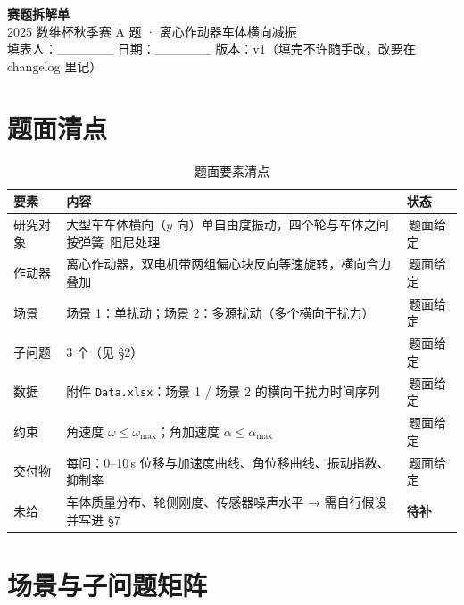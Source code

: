 \documentclass[a4paper,11pt]{ctexart}
\newcommand{\src}[1]{{\footnotesize\colorbox{black!8}{\,#1\,}}}
\newcommand{\given}{\src{题面给定}}
\begin{document}
\begin{center}
  {\LARGE\bfseries 赛题拆解单}\\[0.5em]
  {\large 2025 数维杯秋季赛 A 题 · 离心作动器车体横向减振}\\[0.4em]
  {\small 填表人：\_\_\_\_\_\_ \quad 日期：\_\_\_\_\_\_ \quad 版本：v1（填完不许随手改，改要在 changelog 里记）}
\end{center}

\vspace{0.6em}

\section{题面清点}

\begin{table}[htbp]\centering\small
  \caption{题面要素清点}
  \begin{tabular}{@{}L{0.16\textwidth}L{0.54\textwidth}L{0.16\textwidth}@{}}
    \toprule
    要素 & 内容 & 状态 \\
    \midrule
    研究对象 & 大型车车体横向（$y$ 向）单自由度振动，四个轮与车体之间按弹簧--阻尼处理 & \given \\
    作动器   & 离心作动器，双电机带两组偏心块反向等速旋转，横向合力叠加 & \given \\
    场景     & 场景 1：单扰动；场景 2：多源扰动（多个横向干扰力） & \given \\
    子问题   & 3 个（见 §2） & \given \\
    数据     & 附件 \texttt{Data.xlsx}：场景 1 / 场景 2 的横向干扰力时间序列 & \given \\
    约束     & 角速度 $\omega\le\omega_{\max}$；角加速度 $\alpha\le\alpha_{\max}$ & \given \\
    交付物   & 每问：0--10\,s 位移与加速度曲线、角位移曲线、振动指数、抑制率 & \given \\
    未给     & 车体质量分布、轮侧刚度、传感器噪声水平 → 需自行假设并写进 §7 & \textbf{待补} \\
    \bottomrule
  \end{tabular}
\end{table}

\section{场景与子问题矩阵}
\end{document}
